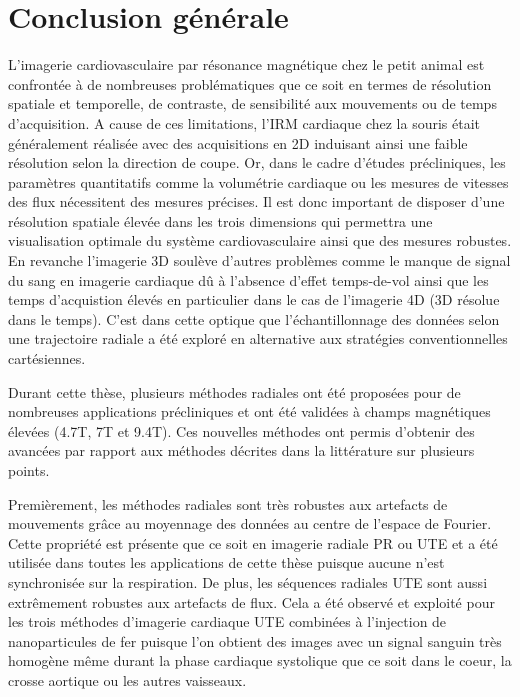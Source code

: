 \chapter{Conclusion générale}

\setlength{\footskip}{50pt}

L'imagerie cardiovasculaire par résonance magnétique chez le petit animal est confrontée à de nombreuses problématiques que ce soit en termes de résolution spatiale et temporelle, de contraste, de sensibilité aux mouvements ou de temps d'acquisition. A cause de ces limitations,  l'IRM cardiaque chez la souris était généralement réalisée avec des acquisitions en 2D induisant ainsi une faible résolution selon la direction de coupe. Or, dans le cadre d'études précliniques, les paramètres quantitatifs comme la volumétrie cardiaque ou les mesures de vitesses des flux nécessitent des mesures précises. Il est donc important de disposer d'une résolution spatiale élevée dans les trois dimensions qui permettra une visualisation optimale du système cardiovasculaire ainsi que des mesures robustes. 
En revanche l'imagerie 3D soulève d'autres problèmes comme le manque de signal du sang en imagerie cardiaque dû à l'absence d'effet temps-de-vol ainsi que les temps d'acquistion élevés en particulier dans le cas de l'imagerie 4D (3D résolue dans le temps).
C'est dans cette optique que l'échantillonnage des données selon une trajectoire radiale a été exploré en alternative aux stratégies conventionnelles cartésiennes. 
\medskip

Durant cette thèse, plusieurs méthodes radiales ont été proposées pour de nombreuses applications précliniques et ont été validées à champs magnétiques élevées (4.7T, 7T et 9.4T).
Ces nouvelles méthodes ont permis d'obtenir des avancées par rapport aux méthodes décrites dans la littérature sur plusieurs points.

Premièrement, les méthodes radiales sont très robustes aux artefacts de mouvements grâce au moyennage des données au centre de l'espace de Fourier. Cette propriété est présente que ce soit en imagerie radiale PR ou UTE et a été utilisée dans toutes les applications de cette thèse puisque aucune n'est synchronisée sur la respiration.
De plus, les séquences radiales UTE sont aussi extrêmement robustes aux artefacts de flux. Cela a été observé et exploité pour les trois méthodes d'imagerie cardiaque UTE combinées à l'injection de nanoparticules de fer puisque l'on obtient des images avec un signal sanguin très homogène même durant la phase cardiaque systolique que ce soit dans le coeur, la crosse aortique ou les autres vaisseaux.


